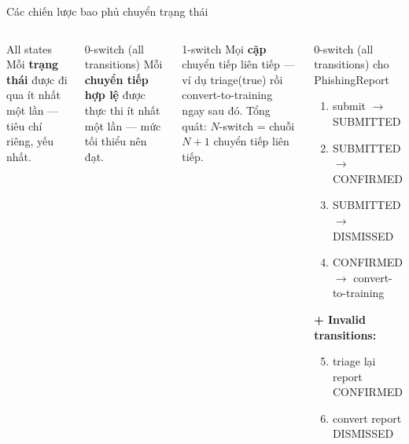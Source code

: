 \documentclass[aspectratio=169,12pt]{beamer}
\begin{document}
\begin{frame}[shrink=10]{Các chiến lược bao phủ chuyển trạng thái}
  \small
  \begin{columns}[T,totalwidth=\textwidth]
    \begin{block}{All states}
      Mỗi \textbf{trạng thái} được đi qua ít nhất một lần
      --- tiêu chí riêng, yếu nhất.
    \end{block}
    \begin{block}{0-switch (all transitions)}
      Mỗi \textbf{chuyển tiếp hợp lệ} được thực thi ít nhất một lần
      --- mức tối thiểu nên đạt.
    \end{block}
    \begin{block}{1-switch}
      Mọi \textbf{cặp} chuyển tiếp liên tiếp --- ví dụ
      triage(true) rồi convert-to-training ngay sau đó.
      Tổng quát: $N$-switch = chuỗi $N{+}1$ chuyển tiếp liên tiếp.
    \end{block}

    \begin{exampleblock}{0-switch (all transitions) cho PhishingReport}
      \begin{enumerate}
        \item submit $\to$ SUBMITTED
        \item SUBMITTED $\to$ CONFIRMED
        \item SUBMITTED $\to$ DISMISSED
        \item CONFIRMED $\to$ convert-to-training
      \end{enumerate}
      \textbf{+ Invalid transitions:}
      \begin{enumerate}
        \setcounter{enumi}{4}
        \item triage lại report CONFIRMED
        \item convert report DISMISSED
      \end{enumerate}
    \end{exampleblock}
  \end{columns}
\end{frame}
\end{document}

